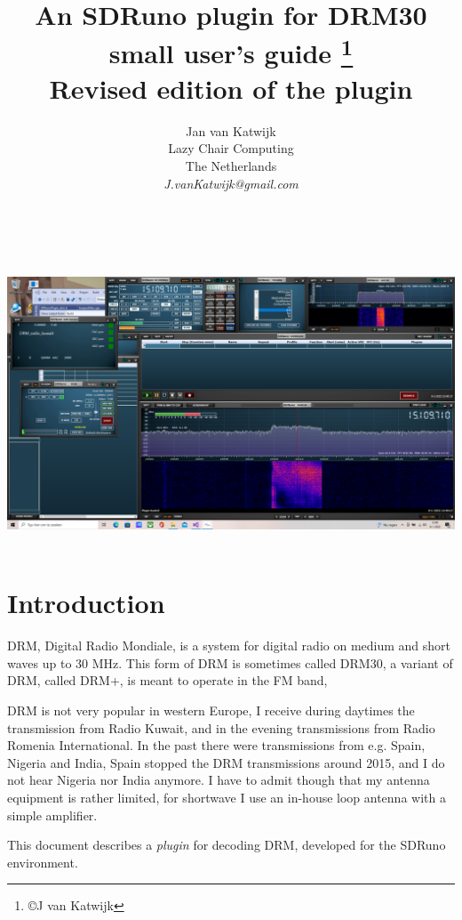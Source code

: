 \documentclass[10pt]{article}
\begin{document}
\title{An SDRuno plugin for DRM30\\
{small user's guide {\footnote {\copyright J van Katwijk}}\\
Revised edition of the plugin}}
\author{
Jan van Katwijk\\
Lazy Chair Computing \\
The Netherlands\\
{\em J.vanKatwijk@gmail.com}}
\maketitle
\ \\
\ \\
\includegraphics[width=160mm]{drm-decoder.png}
\ \\
\section{Introduction}
DRM, Digital Radio Mondiale, is a system for digital radio on medium and
short waves up to 30 MHz. This form of DRM is sometimes called DRM30, a variant
of DRM, called DRM+, is meant to operate in the FM band,
\par 
DRM is not very popular in western Europe, I receive during daytimes the
transmission from Radio Kuwait, and in the evening transmissions from
Radio Romenia International.
In the past there were transmissions from e.g. Spain, Nigeria and India,
Spain stopped the DRM transmissions around 2015, and
I do not hear Nigeria nor India anymore.
I have to admit though that my antenna equipment is rather limited,
for shortwave I use an in-house loop antenna with a simple amplifier.

This document describes a {\em plugin} for decoding DRM,
developed for the SDRuno environment.
\end{document}
